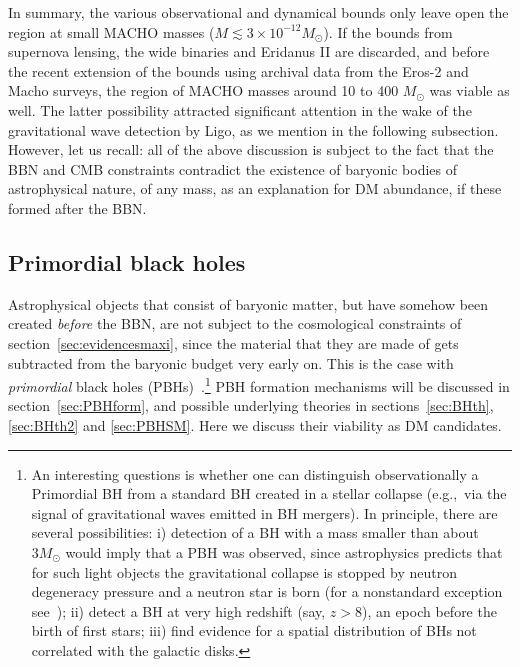 In summary, the various observational and dynamical bounds only leave open the region at small MACHO masses ($M \lesssim 3 \times 10^{-12} M_\odot$). 
If the  bounds from supernova lensing, the wide binaries and Eridanus II are discarded, and before the recent extension of the bounds using archival data from the {\sc Eros-2} and {\sc Macho} surveys, the region of MACHO masses around 10 to 400 $M_\odot$ was viable as well. The latter possibility attracted significant attention in the wake of the gravitational wave detection by {\sc Ligo}, as we mention in the following subsection. \\
However, let us recall: all of the above discussion is subject to the fact that the BBN and CMB constraints contradict the existence of baryonic bodies of astrophysical nature, of any mass, as an explanation for DM abundance, if these formed after the BBN.


\subsection{Primordial black holes}\label{sec:PBHs}
Astrophysical objects that consist of baryonic matter, but have somehow been created {\em before} the BBN, are not subject to the cosmological constraints of section~\ref{sec:evidencesmaxi}, since the material that they are made of gets subtracted  from the baryonic budget very early on. This is the case with {\em primordial} black holes (PBHs)~\cite{PBH}.\footnote{An interesting questions is whether one can distinguish observationally a Primordial BH from a standard BH created in a stellar collapse (e.g.,~via the signal of gravitational waves emitted in BH mergers). In principle, there are several possibilities: i) detection of a BH with a mass smaller than about $3M_\odot$ would imply that a PBH was observed, since astrophysics predicts that for such light objects the gravitational collapse is stopped by neutron degeneracy pressure and a neutron star is born (for a nonstandard exception see~\cite{1804.06740}); ii) detect a BH at very high redshift (say, $z > 8$), an epoch before the birth of first stars; iii) find evidence for a spatial distribution of BHs not correlated with the galactic disks.}
PBH formation mechanisms will be discussed in section~\ref{sec:PBHform}, and possible underlying theories in sections~\ref{sec:BHth}, \ref{sec:BHth2} and \ref{sec:PBHSM}. Here we discuss their viability as DM candidates.




